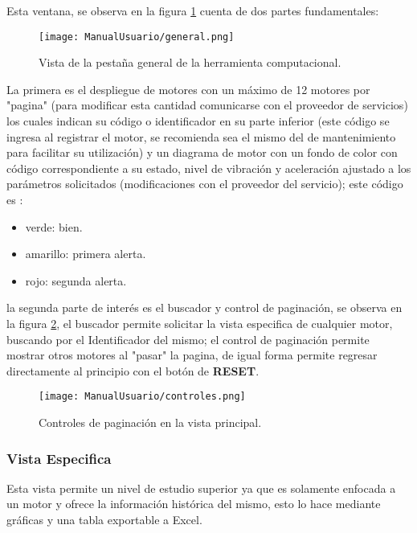 Esta ventana, se observa en la figura \ref{img:vistaGeneralManual}
cuenta de dos partes fundamentales:

    \begin{figure}[H]
		\centering
        \caption{Vista de la pestaña general de la herramienta computacional. }
        \texttt{[image: ManualUsuario/general.png]}
        \label{img:vistaGeneralManual}
	\end{figure}

La primera es el despliegue de motores
con un máximo de 12 motores por "pagina" (para modificar esta cantidad comunicarse
con el proveedor de servicios) los cuales indican su código o identificador en
su parte inferior (este código se ingresa al registrar el motor, se recomienda sea
el mismo del de mantenimiento para facilitar su utilización) y un diagrama de
motor con un fondo de color con código correspondiente a su estado, nivel de
vibración y aceleración ajustado a los parámetros solicitados (modificaciones con
el proveedor del servicio); este código es :

\begin{itemize}
    \item  verde: bien.
    \item amarillo: primera alerta.
    \item rojo: segunda alerta.
\end{itemize}

la segunda parte de interés es el buscador y control de paginación, se observa en
la figura \ref{img:buscadoreGeneral}, el buscador permite solicitar la vista
especifica de cualquier motor, buscando por el Identificador del mismo;
el control de paginación permite mostrar otros motores al "pasar" la pagina,
de igual forma permite regresar directamente al principio con el botón de
\textbf{RESET}.

    \begin{figure}[H]
		\centering
        \caption{Controles de paginación en la vista principal. }
        \texttt{[image: ManualUsuario/controles.png]}
        \label{img:buscadoreGeneral}
	\end{figure}


\subsubsection{Vista Especifica}
Esta vista permite un nivel de estudio superior ya que es solamente enfocada
a un motor y ofrece la información histórica del mismo, esto lo hace mediante
gráficas y una tabla exportable a Excel.

